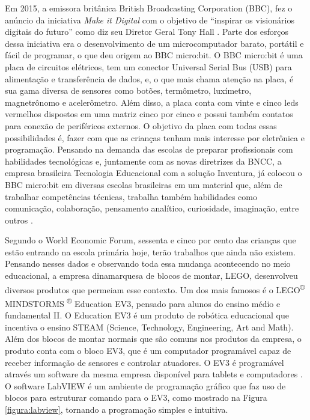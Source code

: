 Em 2015, a emissora britânica British Broadcasting Corporation (BBC), fez o anúncio da iniciativa \emph{Make it Digital} com o objetivo de “inspirar os visionários digitais do futuro” como diz seu Diretor Geral Tony Hall \cite{te_2017}. Parte dos esforços dessa iniciativa era o desenvolvimento de um microcomputador barato, portátil e fácil de programar, o que deu origem ao BBC micro:bit. O BBC micro:bit é uma placa de circuitos elétricos, tem um conector Universal Serial Bus (USB) para alimentação e transferência de dados, e, o que mais chama atenção na placa, é sua gama diversa de sensores como botões, termômetro, luxímetro, magnetrônomo e acelerômetro. Além disso, a placa conta com vinte e cinco leds vermelhos dispostos em uma matriz cinco por cinco e possui também contatos para conexão de periféricos externos. O objetivo da placa com todas essas possibilidades é, fazer com que as crianças tenham mais interesse por eletrônica e programação. Pensando na demanda das escolas de preparar profissionais com habilidades tecnológicas e, juntamente com as novas diretrizes da BNCC, a empresa brasileira Tecnologia Educacional com a solução Inventura, já colocou o BBC micro:bit em diversas escolas brasileiras em um material que, além de trabalhar competências técnicas, trabalha também habilidades como comunicação, colaboração, pensamento analítico, curiosidade, imaginação, entre outros \cite{about_microbit}. 

Segundo o World Economic Forum, sessenta e cinco por cento das crianças que estão entrando na escola primária hoje, terão trabalhos que ainda não existem. Pensando  nesses dados e observando toda essa mudança acontecendo no meio educacional, a empresa dinamarquesa de blocos de montar, LEGO, desenvolveu diversos produtos que permeiam esse contexto. Um dos mais famosos é o LEGO\textsuperscript{®} MINDSTORMS \textsuperscript{®} Education EV3, pensado para alunos do ensino médio e fundamental II. O Education EV3 é um produto de robótica educacional que incentiva o ensino STEAM (Science, Technology, Engineering, Art and Math). Além dos blocos de montar normais que são comuns nos produtos da empresa, o produto conta com o bloco EV3, que é um computador programável capaz de receber informação de sensores e controlar atuadores. O EV3 é programável através um software da mesma empresa disponível para tablets e computadores \cite{lego_mindstorms}. O software LabVIEW é um ambiente de programação gráfico que faz uso de blocos para estruturar comando para o EV3, como mostrado na Figura \ref{figura:labview}, tornando a programação simples e intuitiva. 

